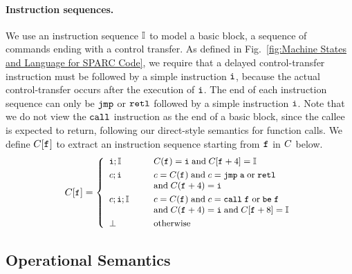 \paragraph{\textbf{Instruction sequences.}}
We use an instruction sequence $\mathbb{I}$ to model
a basic block, \ie{} a sequence of commands ending
with a control transfer.
As defined in Fig.~\ref{fig:Machine States and Language for SPARC Code},
we require that a delayed control-transfer instruction
must be followed by  a simple instruction $\texttt{i}$,
because the actual control-transfer occurs after
the execution of $\texttt{i}$.
The end of each instruction sequence can only be
$\texttt{jmp}$ or $\texttt{retl}$  followed by a simple
instruction $\texttt{i}$.
Note that we do not view the $\texttt{call}$ instruction
as the end of a basic block, since the callee is
expected to return, following our direct-style
semantics for function calls.
We define $C[\texttt{f}_{}]$ to extract
an instruction sequence starting
from $\texttt{f}_{}$ in $C$ below.
\[
	\small
	C[\texttt{f}_{}] =
	\left\{
		\begin{array}{ll}
			\texttt{i}; \mathbb{I} &
			\quad \ \ C(\texttt{f}_{}) = \texttt{i} \;
				\text{and} \; C[\texttt{f}_{}+4] = \mathbb{I} \\
			
			\\[-8pt]
			
			c; \texttt{i} &
			\quad \ \
				c = C(\texttt{f}_{}) \; \text{and} \;
				c = \texttt{jmp} \; \texttt{a} \; \text{or} \; \texttt{retl}
			\\ & \quad \ \ \text{and} \; C(\texttt{f}_{}+4) = \texttt{i} \\
			
			\\[-8pt]
			
			c; \texttt{i}; \mathbb{I} &
			\quad \ \ c = C(\texttt{f}_{}) \;
			\text{and} \; c = \texttt{call} \; \texttt{f}_{} \; \text{or} \; \texttt{be} \; \texttt{f}_{} \\
			& \quad \ \ \text{and} \;
				C(\texttt{f}_{}+4) = \texttt{i} \; \text{and} \;
				C[\texttt{f}_{}+8] = \mathbb{I} \\
			
			\\[-8pt]
			
			\perp & \quad \ \ \text{otherwise}
		\end{array}
	\right.
\]

\subsection{Operational Semantics}
\label{subsec : Operational Semantics}

